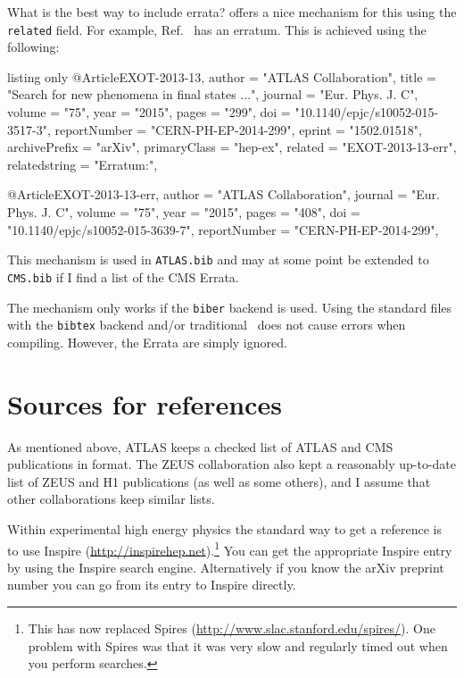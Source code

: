 What is the best way to include errata?
 offers a nice mechanism for this using the \texttt{related} field.
For example, Ref.~\cite{EXOT-2013-13} has an erratum.
This is achieved using the following:
\begin{tcblisting}{listing only}
@Article{EXOT-2013-13,
    author         = "{ATLAS Collaboration}",
    title          = "{Search for new phenomena in final states ...}",
    journal        = "Eur. Phys. J. C",
    volume         = "75",
    year           = "2015",
    pages          = "299",
    doi            = "10.1140/epjc/s10052-015-3517-3",
    reportNumber   = "CERN-PH-EP-2014-299",
    eprint         = "1502.01518",
    archivePrefix  = "arXiv",
    primaryClass   = "hep-ex",
    related        = "EXOT-2013-13-err",
    relatedstring  = "Erratum:",
}

@Article{EXOT-2013-13-err,
    author         = "{ATLAS Collaboration}",
    journal        = "Eur. Phys. J. C",
    volume         = "75",
    year           = "2015",
    pages          = "408",
    doi            = "10.1140/epjc/s10052-015-3639-7",
    reportNumber   = "CERN-PH-EP-2014-299",
}
\end{tcblisting}

This mechanism is used in \texttt{ATLAS.bib} 
and may at some point be extended to \texttt{CMS.bib}
if I find a list of the CMS Errata.

The mechanism only works if the \texttt{biber} backend is used.
Using the standard files with the \texttt{bibtex} backend and/or traditional \BibTeX\ does not cause errors when compiling.
However, the Errata are simply ignored.


\section{Sources for references}%
\label{sec:ref:sources}

As mentioned above, ATLAS keeps a checked list of ATLAS and CMS publications in \BibTeX{} format. 
The ZEUS collaboration also kept a reasonably up-to-date list of ZEUS and
H1 publications (as well as some others),
and I assume that other collaborations keep similar lists.

Within experimental high energy physics the standard way to get a
reference is to use Inspire
(\url{http://inspirehep.net}).\footnote{This has now replaced Spires
(\url{http://www.slac.stanford.edu/spires/}).
One problem with Spires was that it was very slow and regularly
timed out when you perform searches.} You can get the appropriate
Inspire entry by using the Inspire search engine. Alternatively if you
know the arXiv preprint number you can go from its entry to Inspire
directly.

